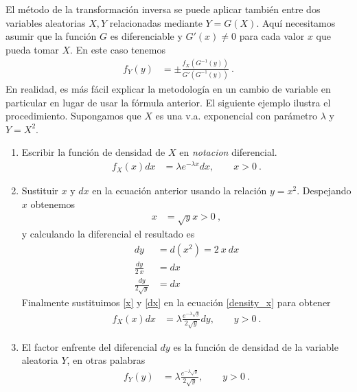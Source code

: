 \documentclass[12pt,reqno]{amsart}\usepackage[]{graphicx}\usepackage[]{color}
\begin{document}
El método de la transformación inversa se puede aplicar también entre dos
variables aleatorias $X,Y$ relacionadas mediante $Y = G(X)$. Aquí necesitamos asumir que la función $G$ es diferenciable y $G'(x)\neq 0$ para cada valor $x$ que pueda tomar $X$. En este caso tenemos
\begin{equation}\label{cambioVariable}
  \begin{split}
  f_{Y}(y) &= \pm \frac{f_{X}(G^{-1}(y))}{G'(G^{-1}(y))}\:.
  \end{split}
\end{equation}
En realidad, es más fácil explicar la metodología en un cambio de variable en particular en lugar de usar la fórmula anterior. El siguiente ejemplo ilustra el procedimiento. Supongamos que $X$ es una v.a. exponencial con parámetro $\lambda$ y $ Y = X^2$.
\begin{enumerate}
\item Escribir la función de densidad de $X$ en \emph{notacion} diferencial.
\begin{equation}\label{density_x}
  \begin{split}
  f_{X}(x) dx &= \lambda e^{-\lambda x} dx,\qquad x > 0\:.
  \end{split}
\end{equation}
\item Sustituir $x$ y $dx$ en la ecuación anterior usando la relación $y = x^2$. 
Despejando $x$ obtenemos
\begin{equation}\label{x}
  \begin{split}
  x &= \sqrt{y} x > 0\:,  
  \end{split}
\end{equation}
y calculando la diferencial el resultado es
\begin{equation}\label{dx}
  \begin{split}
  dy &= d(x^2) = 2\:x\:dx\\
  \frac{dy}{2\:x} &= dx \\
  \frac{dy}{2\sqrt{y}} &= dx
  \end{split}
\end{equation}
Finalmente sustituimos \eqref{x} y \eqref{dx} en la ecuación \eqref{density_x} para obtener
\begin{equation}\label{substitute_y}
  \begin{split}
  f_{X}(x) dx &= \lambda \frac{e^{-\lambda \sqrt{y}}}{2\sqrt{y}}dy,\qquad y > 0\:.
  \end{split}
\end{equation}
\item El factor enfrente del diferencial $dy$ es la función de densidad de la variable aleatoria $Y$, en otras palabras
\begin{equation}\label{density_y}
  \begin{split}
  f_{Y}(y) &= \lambda \frac{e^{-\lambda \sqrt{y}}}{2\sqrt{y}},\qquad y > 0\:.
  \end{split}
\end{equation}

\end{enumerate}
\end{document}
